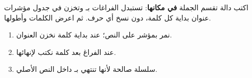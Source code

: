 \begin{statement}
اكتب دالة  تقسم الجملة \textbf{في مكانها}: تستبدل الفراغات بـ  وتخزن في جدول مؤشرات  عنوان بداية كل كلمة، دون نسخ أي حرف. ثم اعرض الكلمات وأطولها.
\end{statement}
\begin{stepsbox}\begin{enumerate}
\item نمر بمؤشر على النص؛ عند بداية كلمة نخزن العنوان.
\item عند الفراغ بعد كلمة نكتب  لإنهائها.
\item {} سلسلة صالحة لأنها تنتهي بـ  داخل النص الأصلي.
\end{enumerate}\end{stepsbox}

